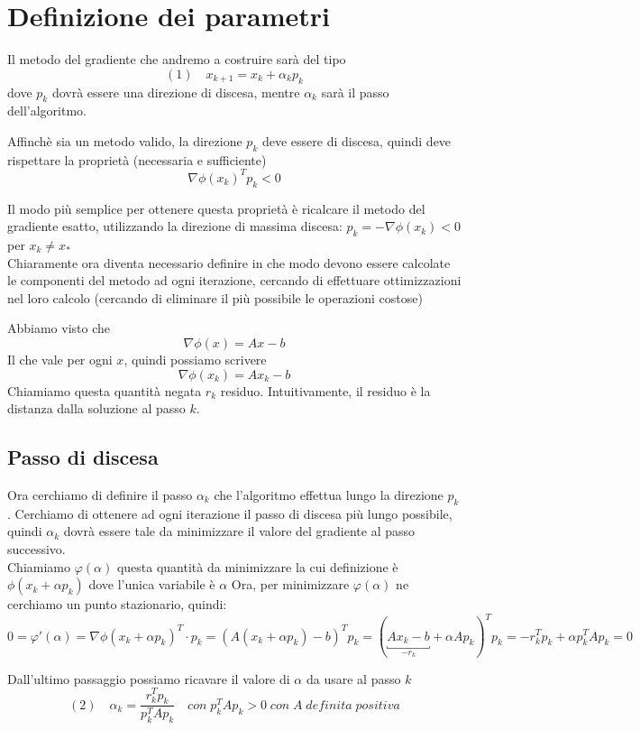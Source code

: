 \section{Definizione dei parametri} Il metodo del gradiente che
andremo a costruire sarà del tipo
$$(1) \quad  x_{k+1} = x_{k} +  \alpha_{k} p_{k}$$
dove $p_{k}$ dovrà essere una direzione di discesa, mentre
$\alpha_{k}$ sarà il passo dell'algoritmo.

Affinch\`e sia un metodo valido, la direzione $p_{k}$ deve essere di
discesa, quindi deve rispettare la proprietà (necessaria e
sufficiente) $$ \nabla \phi(x_{k})^{T} p_{k} < 0$$

Il modo più semplice per ottenere questa proprietà \`e ricalcare il
metodo del gradiente esatto, utilizzando la direzione di massima
discesa: $ p_{k} = - \nabla \phi (x_{k}) < 0 $ per $ x_{k} \neq x_{*}$
\\ Chiaramente ora diventa necessario definire in che modo devono
essere calcolate le componenti del metodo ad ogni iterazione,
cercando di effettuare ottimizzazioni nel loro calcolo (cercando di
eliminare il più possibile le operazioni costose)

Abbiamo visto che
$$\nabla \phi(x) = Ax-b$$
Il che vale per ogni $x$, quindi possiamo scrivere
$$\nabla \phi(x_{k}) = Ax_{k}-b$$
Chiamiamo questa quantità negata $r_{k}$ residuo. Intuitivamente, il residuo è la distanza dalla soluzione al passo $k$.
\subsection{Passo di discesa} Ora cerchiamo di definire il passo
$\alpha_{k}$ che l'algoritmo effettua lungo la direzione $p_{k}$.
Cerchiamo di ottenere ad ogni iterazione il passo di discesa più lungo
possibile, quindi $\alpha_{k}$ dovrà essere tale da minimizzare il
valore del gradiente al passo successivo.  \\ Chiamiamo $\varphi
(\alpha)$ questa quantità da minimizzare la cui definizione \`e
$\phi(x_{k} + \alpha p_{k})$ dove l'unica variabile \`e $\alpha$ Ora,
per minimizzare $\varphi (\alpha)$ ne cerchiamo un punto stazionario,
quindi:
$$ 0 = \varphi'(\alpha) = 
\nabla \phi (x_{k} + \alpha p_{k})^{T} \cdot p_{k} = (A (x_{k}
+ \alpha p_{k}) -b)^{T} p_{k} = ( \underbracket{A x_{k} -b}_{-r_{k}} +
\alpha A p_{k})^{T} p_{k} = - r_{k}^{T} p_{k} + \alpha p_{k}^{T} A
p_{k} = 0
$$

Dall'ultimo passaggio possiamo ricavare il valore di $\alpha$ da usare
al passo $k$
$$(2) \quad \alpha_{k} = \frac{ r_{k}^{T} p_{k}}{p_{k}^{T} A p_{k}} \quad con \;p_{k}^{T}Ap_{k} > 0 \;con\; A\; definita\; positiva $$

